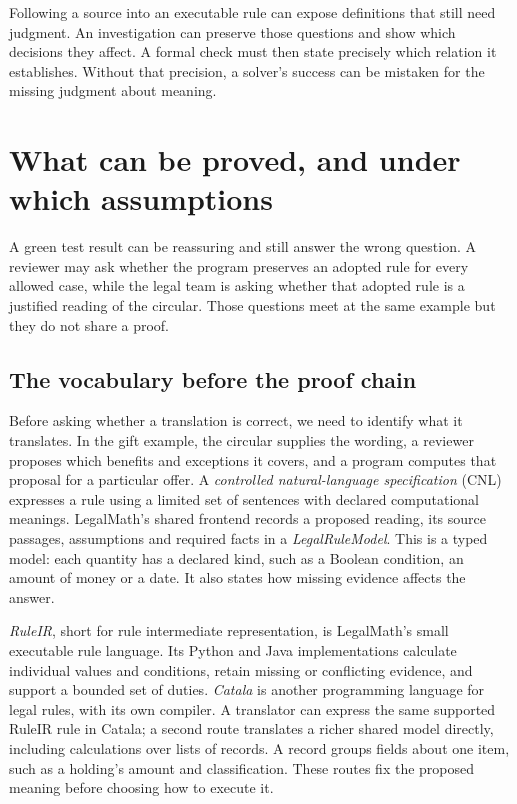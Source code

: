 \documentclass[12pt,a4paper,oneside,openany]{book}
\begin{document}
Following a source into an executable rule can expose definitions that still
need judgment. An investigation can preserve those questions and show which
decisions they affect. A formal check must then state precisely which relation
it establishes. Without that precision, a solver's success can be mistaken for
the missing judgment about meaning.

\chapter{What can be proved, and under which assumptions}
\label{ch:proof}

A green test result can be reassuring and still answer the wrong question. A
reviewer may ask whether the program preserves an adopted rule for every allowed
case, while the legal team is asking whether that adopted rule is a justified
reading of the circular. Those questions meet at the same example but they do
not share a proof.

\section{The vocabulary before the proof chain}
\label{sec:proof-vocabulary}

Before asking whether a translation is correct, we need to identify what it
translates. In the gift example, the circular supplies the wording, a reviewer
proposes which benefits and exceptions it covers, and a program computes that
proposal for a particular offer. A \emph{controlled natural-language
specification} (CNL) expresses a rule using a limited set of sentences with
declared computational meanings. LegalMath's shared frontend records a proposed
reading, its source passages, assumptions and required facts in a
\emph{LegalRuleModel}. This is a typed model: each quantity has a declared kind,
such as a Boolean condition, an amount of money or a date. It also states how
missing evidence affects the answer.

\emph{RuleIR}, short for rule intermediate representation, is LegalMath's
small executable rule language. Its Python and Java implementations calculate
individual values and conditions, retain missing or conflicting evidence, and
support a bounded set of duties. \emph{Catala} is another programming language
for legal rules, with its own compiler. A translator can express the same
supported RuleIR rule in Catala; a second route translates a richer shared
model directly, including calculations over lists of records. A record groups
fields about one item, such as a holding's amount and classification. These
routes fix the proposed meaning before choosing how to execute it.
\end{document}
